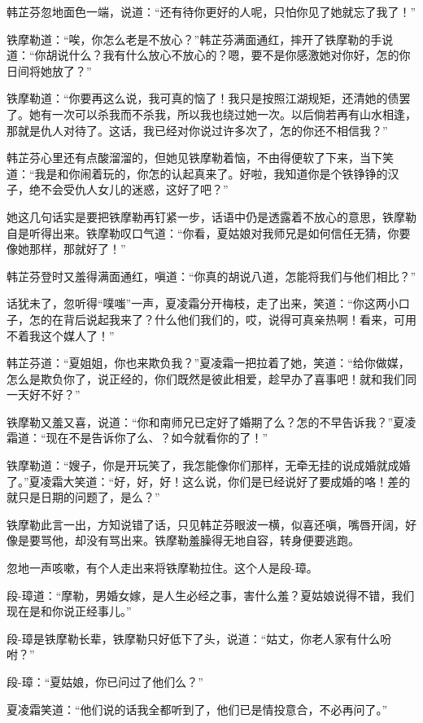\documentclass[12pt,oneside]{book}
\begin{document}
韩芷芬忽地面色一端，说道：``还有待你更好的人呢，只怕你见了她就忘了我了！''

铁摩勒道：``唉，你怎么老是不放心？''韩芷芬满面通红，摔开了铁摩勒的手说道：``你胡说什么？我有什么放心不放心的？嗯，要不是你感激她对你好，怎的你日间将她放了？''

铁摩勒道：``你要再这么说，我可真的恼了！我只是按照江湖规矩，还清她的债罢了。她有一次可以杀我而不杀我，所以我也绕过她一次。以后倘若再有山水相逢，那就是仇人对待了。这话，我已经对你说过许多次了，怎的你还不相信我？''

韩芷芬心里还有点酸溜溜的，但她见铁摩勒着恼，不由得便软了下来，当下笑道：``我是和你闹着玩的，你怎的认起真来了。好啦，我知道你是个铁铮铮的汉子，绝不会受仇人女儿的迷惑，这好了吧？''

她这几句话实是要把铁摩勒再钉紧一步，话语中仍是透露着不放心的意思，铁摩勒自是听得出来。铁摩勒叹口气道：``你看，夏姑娘对我师兄是如何信任无猜，你要像她那样，那就好了！''

韩芷芬登时又羞得满面通红，嗔道：``你真的胡说八道，怎能将我们与他们相比？''

话犹未了，忽听得``噗嗤''一声，夏凌霜分开梅枝，走了出来，笑道：``你这两小口子，怎的在背后说起我来了？什么他们我们的，哎，说得可真亲热啊！看来，可用不着我这个媒人了！''

韩芷芬道：``夏姐姐，你也来欺负我？''夏凌霜一把拉着了她，笑道：``给你做媒，怎么是欺负你了，说正经的，你们既然是彼此相爱，趁早办了喜事吧！就和我们同一天好不好？''

铁摩勒又羞又喜，说道：``你和南师兄已定好了婚期了么？怎的不早告诉我？''夏凌霜道：``现在不是告诉你了么、？如今就看你的了！''

铁摩勒道：``嫂子，你是开玩笑了，我怎能像你们那样，无牵无挂的说成婚就成婚了。''夏凌霜大笑道：``好，好，好！这么说，你们是已经说好了要成婚的咯！差的就只是日期的问题了，是么？''

铁摩勒此言一出，方知说错了话，只见韩芷芬眼波一横，似喜还嗔，嘴唇开阔，好像是要骂他，却没有骂出来。铁摩勒羞臊得无地自容，转身便要逃跑。

忽地一声咳嗽，有个人走出来将铁摩勒拉住。这个人是段-璋。

段-璋道：``摩勒，男婚女嫁，是人生必经之事，害什么羞？夏姑娘说得不错，我们现在是和你说正经事儿。''

段-璋是铁摩勒长辈，铁摩勒只好低下了头，说道：``姑丈，你老人家有什么吩咐？''

段-璋：``夏姑娘，你已问过了他们么？''

夏凌霜笑道：``他们说的话我全都听到了，他们已是情投意合，不必再问了。''
\end{document}
